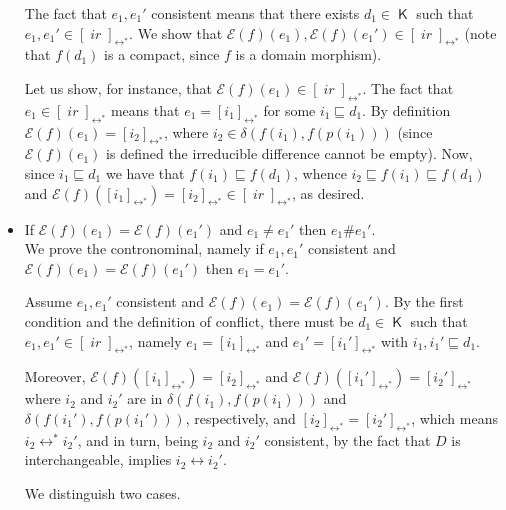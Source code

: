 \documentclass[conference]{IEEEtran}
\renewenvironment{proof}{\begin{IEEEproof}}{\end{IEEEproof}}
\newcommand{\wi}{{interchangeable}}
\newcommand{\compact}[1]{\ensuremath{\mathop{\mathsf{K}({#1})}}}
\newcommand{\ir}[1]{\ensuremath{\mathop{\mathit{ir}({#1})}}}
\newcommand{\diff}[2]{\ensuremath{\delta({#1},{#2})}}
\newcommand{\pred}[1]{\ensuremath{\mathit{p}({#1})}}
\newcommand{\eqclass}[2][]{\ensuremath{[{#2}]_{\scriptscriptstyle {#1}}}}
\newcommand{\eqclassir}[1]{\ensuremath{\eqclass[\leftrightarrow^*]{#1}}}
\newcommand{\zev}[0]{\ensuremath{\mathcal{E}}}
\newcommand{\ev}[1]{\ensuremath{\zev({#1})}}
\begin{document}
\begin{proof}
\begin{itemize}
    The fact that $e_1, e_1'$ consistent means that there exists
    $d_1 \in \compact{D_1}$ such that
    $e_1, e_1' \in \eqclassir{\ir{d_1}}$. We show that
    $\ev{f}(e_1), \ev{f}(e_1') \in \eqclassir{\ir{f(d_1)}}$ (note
    that $f(d_1)$ is a compact, since $f$ is a domain morphism). 

    Let us show, for instance, that
    $\ev{f}(e_1) \in \eqclassir{\ir{f(d_1)}}$. The fact that
    $e_1 \in \eqclassir{\ir{d_1}}$ means that $e_1 = \eqclassir{i_1}$
    for some $i_1 \sqsubseteq d_1$. By definition
    $\ev{f}(e_1) = \eqclassir{i_2}$, where
    $i_2 \in \diff{f(i_1)}{f(\pred{i_1})}$ (since $\ev{f}(e_1)$ is
    defined the irreducible difference cannot be empty). Now, since
    $i_1 \sqsubseteq d_1$ we have that $f(i_1) \sqsubseteq f(d_1)$,
    whence $i_2 \sqsubseteq f(i_1) \sqsubseteq f(d_1)$ and
    $\ev{f}(\eqclassir{i_1}) = \eqclassir{i_2} \in
    \eqclassir{\ir{f(d_1)}}$, as desired.

  \item If $\ev{f}(e_1) = \ev{f}(e_1')$ and $e_1 \neq e_1'$ 
    then $e_1 \# e_1'$.\\
    We prove the contronominal, namely if $e_1, e_1'$ consistent and
    $\ev{f}(e_1) = \ev{f}(e_1')$ then $e_1=e_1'$.

    Assume $e_1, e_1'$ consistent and $\ev{f}(e_1) = \ev{f}(e_1')$. By
    the first condition and the definition of conflict, there must be $d_1 \in \compact{D_1}$ such
    that $e_1, e_1' \in \eqclassir{\ir{d_1}}$, namely
    $e_1=\eqclassir{i_1}$ and ${e_1'}=\eqclassir{i_1'}$ with
    $i_1, i_1' \sqsubseteq d_1$.

    Moreover, $\ev{f}(\eqclassir{i_1}) = \eqclassir{i_2}$ and
    $\ev{f}(\eqclassir{i_1'}) = \eqclassir{i_2'}$ where $i_2$ and
    $i_2'$ are in $\diff{f(i_1)}{f(\pred{i_1})}$ and
    $\diff{f(i_1')}{f(\pred{i_1'})}$, respectively, and
    $\eqclassir{i_2} = \eqclassir{i_2'}$, which means
    $i_2 \leftrightarrow^* i_2'$, and in turn, being $i_2$ and $i_2'$
    consistent, by the fact that $D$ is {\wi},
    implies
    $i_2 \leftrightarrow i_2'$. 

    We distinguish two cases.


\end{itemize}
\end{proof}
\end{document}
